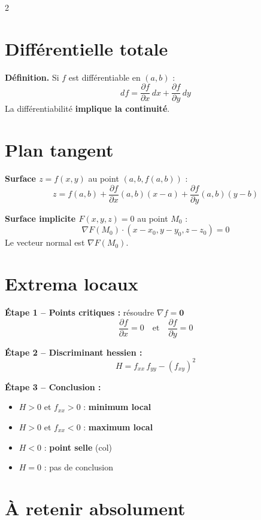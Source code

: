 \documentclass[10pt,a4paper]{article}
\begin{document}
\begin{multicols}{2}
\section{Différentielle totale}

\begin{grisbox}
\textbf{Définition.} Si $f$ est différentiable en $(a,b)$ :
$$df = \frac{\partial f}{\partial x}\,dx + \frac{\partial f}{\partial y}\,dy$$
La différentiabilité \textbf{implique la continuité}.
\end{grisbox}

\section{Plan tangent}

\begin{grisbox}
\textbf{Surface $z=f(x,y)$} au point $(a,b,f(a,b))$ :
$$\boxed{z = f(a,b) + \frac{\partial f}{\partial x}(a,b)(x-a) + \frac{\partial f}{\partial y}(a,b)(y-b)}$$

\textbf{Surface implicite $F(x,y,z)=0$} au point $M_0$ :
$$\nabla F(M_0)\cdot(x-x_0,y-y_0,z-z_0)=0$$
Le vecteur normal est $\nabla F(M_0)$.
\end{grisbox}

\section{Extrema locaux}

\begin{grisbox}
\textbf{Étape 1 -- Points critiques :} résoudre $\nabla f = \mathbf{0}$
$$\frac{\partial f}{\partial x}=0 \quad \text{et} \quad \frac{\partial f}{\partial y}=0$$

\textbf{Étape 2 -- Discriminant hessien :}
$$H = f_{xx}\,f_{yy} - (f_{xy})^2$$

\textbf{Étape 3 -- Conclusion :}
\begin{itemize}[leftmargin=1em,itemsep=1pt]
  \item $H > 0$ et $f_{xx}>0$ : \textbf{minimum local}
  \item $H > 0$ et $f_{xx}<0$ : \textbf{maximum local}
  \item $H < 0$ : \textbf{point selle} (col)
  \item $H = 0$ : pas de conclusion
\end{itemize}
\end{grisbox}

\section{À retenir absolument}


\end{multicols}
\end{document}
